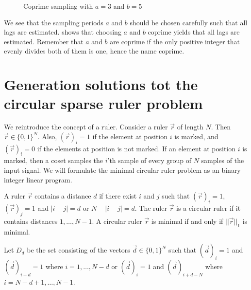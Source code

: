 \documentclass[a4paper, openany, oneside]{memoir}
\begin{document}
\begin{figure}
{}
\caption{Coprime sampling with $a=3$ and $b=5$}\label{tkz:coprime_ruler}
\end{figure}

We see that the sampling periods $a$ and $b$ should be chosen carefully such that all lags are estimated. \cite{pal2011coprime} shows that choosing $a$ and $b$ coprime yields that all lags are estimated. Remember that $a$ and $b$ are coprime if the only positive integer that evenly divides both of them is one, hence the name coprime.




\chapter{Generation solutions tot the circular sparse ruler problem}\label{ap:derivation_ILP}
We reintroduce the concept of a ruler. Consider a ruler $\vec{r}$ of length $N$. Then $\vec{r} \in \{0,1\}^N$. Also, $(\vec{r})_i = 1$ if the element at position $i$ is marked, and $(\vec{r})_i = 0$ if the elements at position is not marked. If an element at position $i$ is marked, then a coset samples the $i$'th sample of every group of $N$ samples of the input signal. We will formulate the minimal circular ruler problem as an binary integer linear program.

A ruler $\vec{r}$ contains a distance $d$ if there exist $i$ and $j$ such that $(\vec{r})_i = 1$, $(\vec{r})_j = 1$ and $|i-j| = d$ or  $N-|i-j| = d$. The ruler $\vec{r}$ is a circular ruler if it contains distances $ 1, \ldots, N - 1$. A circular ruler $\vec{r}$ is minimal if and only if $||\vec{r}||_1$ is minimal.

Let $D_d$ be the set consisting of the vectors $\vec{d} \in \{0,1\}^N$ such that $(\vec{d})_i=1$ and $(\vec{d})_{i+d}=1$ where $i = 1,\ldots,N-d$ or $(\vec{d})_i=1$ and $(\vec{d})_{i+d-N}$ where $i = N-d+1,\ldots,N-1$.
\end{document}
